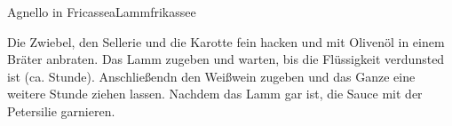 \begin{recipe}{Agnello in Fricassea}{Lammfrikassee}
  \inglist
  
  \steps
  Die Zwiebel, den Sellerie und die Karotte fein hacken und mit Olivenöl in einem Bräter
  anbraten. Das Lamm zugeben und warten, bis die Flüssigkeit verdunsted ist (ca. \halb
  Stunde). Anschließendn den Weißwein zugeben und das Ganze eine weitere Stunde ziehen
  lassen. Nachdem das Lamm gar ist, die Sauce mit der Petersilie garnieren.
\end{recipe}
